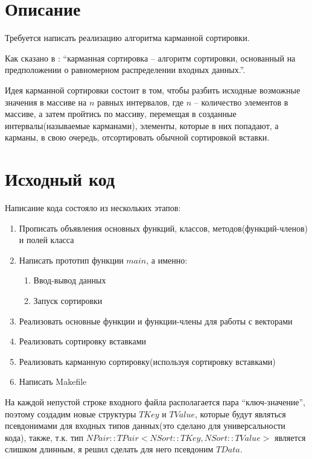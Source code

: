 \section{Описание}
Требуется написать реализацию алгоритма карманной сортировки. 

Как сказано в \cite{neerc_wiki}: \enquote{карманная сортировка -- алгоритм сортировки, основанный на предположении о равномерном распределении входных данных.}.

Идея карманной сортировки состоит в том, чтобы разбить исходные возможные значения в массиве на $n$ равных интервалов,
где $n$ -- количество элементов в массиве, а затем пройтись по массиву, перемещая в созданные интервалы(называемые карманами), 
элементы, которые в них попадают, а карманы, в свою очередь, отсортировать обычной сортировкой вставки.

\pagebreak

\section{Исходный код}
Написание кода состояло из нескольких этапов:
\begin{enumerate}
	\item Прописать объявления основных функций, классов, методов(функций-членов) и полей класса
	\item Написать прототип функции $main$, а именно:
	\begin{enumerate}
		\item Ввод-вывод данных
		\item Запуск сортировки
	\end{enumerate}
	\item Реализовать основные функции и функции-члены для работы с векторами
	\item Реализовать сортировку вставками
	\item Реализовать карманную сортировку(используя сортировку вставками)
	\item Написать Makefile
\end{enumerate}

На каждой непустой строке входного файла располагается пара \enquote{ключ-значение}, поэтому создадим новые 
структуры $TKey$ и $TValue$, которые будут являться псевдонимами для входных типов данных(это сделано для универсальности кода), также, т.к. тип $NPair::TPair<NSort::TKey, NSort::TValue>$
является слишком длинным, я решил сделать для него псевдоним $TData$.

